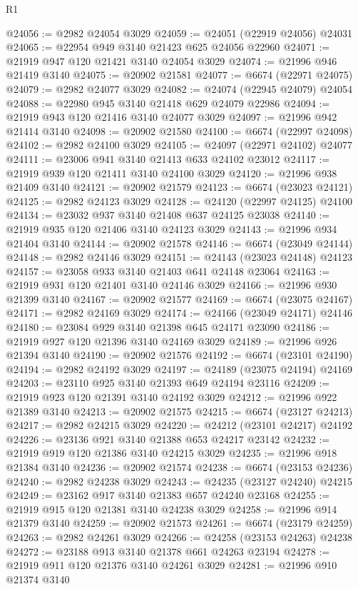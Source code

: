 \begin{lexlean}{R1}
\begin{coremodule}
@24056 := @2982 @24054 @3029
@24059 := @24051 (@22919 @24056) @24031
@24065 := @22954 @949 @3140 @21423 @625 @24056 @22960
@24071 := @21919 @947 @120 @21421 @3140 @24054 @3029
@24074 := @21996 @946 @21419 @3140
@24075 := @20902 @21581
@24077 := @6674 (@22971 @24075)
@24079 := @2982 @24077 @3029
@24082 := @24074 (@22945 @24079) @24054
@24088 := @22980 @945 @3140 @21418 @629 @24079 @22986
@24094 := @21919 @943 @120 @21416 @3140 @24077 @3029
@24097 := @21996 @942 @21414 @3140
@24098 := @20902 @21580
@24100 := @6674 (@22997 @24098)
@24102 := @2982 @24100 @3029
@24105 := @24097 (@22971 @24102) @24077
@24111 := @23006 @941 @3140 @21413 @633 @24102 @23012
@24117 := @21919 @939 @120 @21411 @3140 @24100 @3029
@24120 := @21996 @938 @21409 @3140
@24121 := @20902 @21579
@24123 := @6674 (@23023 @24121)
@24125 := @2982 @24123 @3029
@24128 := @24120 (@22997 @24125) @24100
@24134 := @23032 @937 @3140 @21408 @637 @24125 @23038
@24140 := @21919 @935 @120 @21406 @3140 @24123 @3029
@24143 := @21996 @934 @21404 @3140
@24144 := @20902 @21578
@24146 := @6674 (@23049 @24144)
@24148 := @2982 @24146 @3029
@24151 := @24143 (@23023 @24148) @24123
@24157 := @23058 @933 @3140 @21403 @641 @24148 @23064
@24163 := @21919 @931 @120 @21401 @3140 @24146 @3029
@24166 := @21996 @930 @21399 @3140
@24167 := @20902 @21577
@24169 := @6674 (@23075 @24167)
@24171 := @2982 @24169 @3029
@24174 := @24166 (@23049 @24171) @24146
@24180 := @23084 @929 @3140 @21398 @645 @24171 @23090
@24186 := @21919 @927 @120 @21396 @3140 @24169 @3029
@24189 := @21996 @926 @21394 @3140
@24190 := @20902 @21576
@24192 := @6674 (@23101 @24190)
@24194 := @2982 @24192 @3029
@24197 := @24189 (@23075 @24194) @24169
@24203 := @23110 @925 @3140 @21393 @649 @24194 @23116
@24209 := @21919 @923 @120 @21391 @3140 @24192 @3029
@24212 := @21996 @922 @21389 @3140
@24213 := @20902 @21575
@24215 := @6674 (@23127 @24213)
@24217 := @2982 @24215 @3029
@24220 := @24212 (@23101 @24217) @24192
@24226 := @23136 @921 @3140 @21388 @653 @24217 @23142
@24232 := @21919 @919 @120 @21386 @3140 @24215 @3029
@24235 := @21996 @918 @21384 @3140
@24236 := @20902 @21574
@24238 := @6674 (@23153 @24236)
@24240 := @2982 @24238 @3029
@24243 := @24235 (@23127 @24240) @24215
@24249 := @23162 @917 @3140 @21383 @657 @24240 @23168
@24255 := @21919 @915 @120 @21381 @3140 @24238 @3029
@24258 := @21996 @914 @21379 @3140
@24259 := @20902 @21573
@24261 := @6674 (@23179 @24259)
@24263 := @2982 @24261 @3029
@24266 := @24258 (@23153 @24263) @24238
@24272 := @23188 @913 @3140 @21378 @661 @24263 @23194
@24278 := @21919 @911 @120 @21376 @3140 @24261 @3029
@24281 := @21996 @910 @21374 @3140

\end{coremodule}
\end{lexlean}
